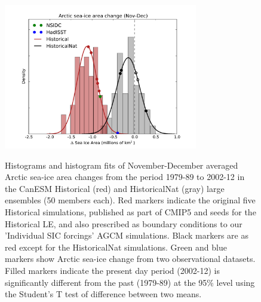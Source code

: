 \documentclass[grl]{AGUTeX}  %
\begin{document}
\begin{article}
\begin{figure}[t] %
  \noindent\includegraphics[width=20pc,angle=0]{fig1.pdf} \\ 
  \caption{Histograms and histogram fits of November-December averaged Arctic sea-ice area changes from the period 1979-89 to 2002-12 in the CanESM Historical (red) and HistoricalNat (gray) large ensembles (50 members each). Red markers indicate the original five Historical simulations, published as part of CMIP5 and seeds for the Historical LE, and also prescribed as boundary conditions to our 'Individual SIC forcings' AGCM simulations. Black markers are as red except for the HistoricalNat simulations. Green and blue markers show Arctic sea-ice change from two observational datasets. Filled markers indicate the present day period (2002-12) is significantly different from the past (1979-89) at the 95\% level using the Student's T test of difference between two means.
}\label{fig:fig1}
\end{figure}


\end{article}
\end{document}
